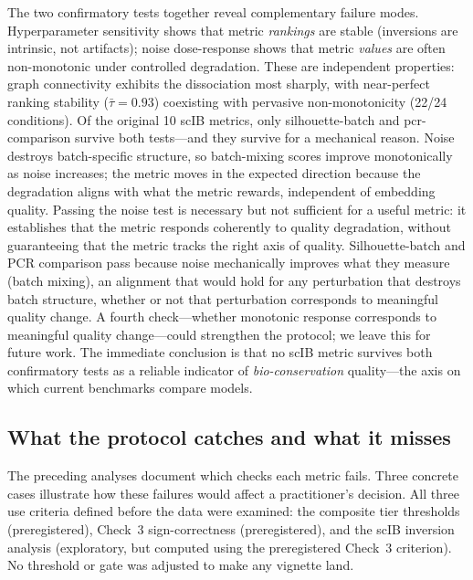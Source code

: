 \documentclass[10pt,letterpaper]{article}
\begin{document}
The two confirmatory tests together reveal complementary failure modes. Hyperparameter sensitivity shows that metric \emph{rankings} are stable (inversions are intrinsic, not artifacts); noise dose-response shows that metric \emph{values} are often non-monotonic under controlled degradation. These are independent properties: graph connectivity exhibits the dissociation most sharply, with near-perfect ranking stability ($\bar{\tau} = 0.93$) coexisting with pervasive non-monotonicity (22/24 conditions). Of the original 10 scIB metrics, only silhouette-batch and pcr-comparison survive both tests---and they survive for a mechanical reason. Noise destroys batch-specific structure, so batch-mixing scores improve monotonically as noise increases; the metric moves in the expected direction because the degradation aligns with what the metric rewards, independent of embedding quality. Passing the noise test is necessary but not sufficient for a useful metric: it establishes that the metric responds coherently to quality degradation, without guaranteeing that the metric tracks the right axis of quality. Silhouette-batch and PCR comparison pass because noise mechanically improves what they measure (batch mixing), an alignment that would hold for any perturbation that destroys batch structure, whether or not that perturbation corresponds to meaningful quality change. A fourth check---whether monotonic response corresponds to meaningful quality change---could strengthen the protocol; we leave this for future work. The immediate conclusion is that no scIB metric survives both confirmatory tests as a reliable indicator of \emph{bio-conservation} quality---the axis on which current benchmarks compare models.


\subsection{What the protocol catches and what it misses}

The preceding analyses document which checks each metric fails. Three concrete cases illustrate how these failures would affect a practitioner's decision. All three use criteria defined before the data were examined: the composite tier thresholds (preregistered), Check~3 sign-correctness (preregistered), and the scIB inversion analysis (exploratory, but computed using the preregistered Check~3 criterion). No threshold or gate was adjusted to make any vignette land.
\end{document}
